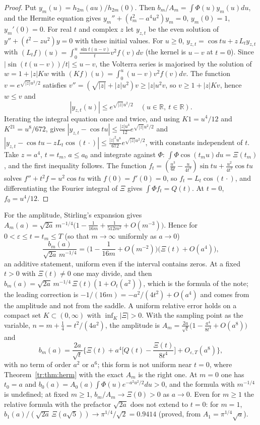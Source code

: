 \begin{proof}
Put $y_m(u)=h_{2m}(au)/h_{2m}(0)$. Then $b_m/A_m=\int\Phi(u)y_m(u)du$, and the Hermite equation gives $y_m''+(t_m^2-a^4u^2)y_m=0$, $y_m(0)=1$, $y_m'(0)=0$. For real $t$ and complex $z$ let $y_{z,t}$ be the even solution of $y''+(t^2-zu^2)y=0$ with these initial values. For $u\ge0$, $y_{z,t}=\cos tu+z\,L_ty_{z,t}$ with $(L_tf)(u)=\int_0^u\frac{\sin t(u-v)}tv^2f(v)dv$ (the kernel is $u-v$ at $t=0$). Since $|\sin(t(u-v))/t|\le u-v$, the Volterra series is majorised by the solution of $w=1+|z|Kw$ with $(Kf)(u)=\int_0^u(u-v)v^2f(v)dv$. The function $v=e^{\sqrt{|z|}u^2/2}$ satisfies $v''=(\sqrt{|z|}+|z|u^2)v\ge|z|u^2v$, so $v\ge1+|z|Kv$, hence $w\le v$ and
\[
|y_{z,t}(u)|\le e^{\sqrt{|z|}u^2/2}\quad(u\in\mathbb R,\ t\in\mathbb R).
\]
Iterating the integral equation once and twice, and using $K1=u^4/12$ and $K^21=u^8/672$, gives $|y_{z,t}-\cos tu|\le\frac{|z|u^4}{12}e^{\sqrt{|z|}u^2/2}$ and $|y_{z,t}-\cos tu-zL_t\cos(t\,\cdot)|\le\frac{|z|^2u^8}{672}e^{\sqrt{|z|}u^2/2}$, with constants independent of $t$. Take $z=a^4$, $t=t_m$, $a\le a_0$ and integrate against $\Phi$: $\int\Phi\cos(t_mu)du=\Xi(t_m)$, and the first inequality follows. The function $f_t=(\frac{u^3}{6t}-\frac u{4t^3})\sin tu+\frac{u^2}{4t^2}\cos tu$ solves $f''+t^2f=u^2\cos tu$ with $f(0)=f'(0)=0$, so $f_t=L_t\cos(t\,\cdot)$, and differentiating the Fourier integral of $\Xi$ gives $\int\Phi f_t=Q(t)$. At $t=0$, $f_0=u^4/12$.
\end{proof}

For the amplitude, Stirling's expansion gives $A_m(a)=\sqrt{2a}\,m^{-1/4}\big(1-\frac1{16m}+\frac1{512m^2}+O(m^{-3})\big)$. Hence for $0<\varepsilon\le t=t_m\le T$ (so that $m\to\infty$ uniformly as $a\to0$)
\begin{equation}\label{tr:eq:amp}
\frac{b_m(a)}{\sqrt{2a}\,m^{-1/4}}=\Big(1-\frac1{16m}+O(m^{-2})\Big)\big(\Xi(t)+O(a^4)\big),
\end{equation}
an additive statement, uniform even if the interval contains zeros. At a fixed $t>0$ with $\Xi(t)\ne0$ one may divide, and then $b_m(a)=\sqrt{2a}\,m^{-1/4}\,\Xi(t)(1+O_t(a^2))$, which is the formula of the note; the leading correction is $-1/(16m)=-a^2/(4t^2)+O(a^4)$ and comes from the amplitude and not from the saddle. A uniform relative error holds on a compact set $K\subset(0,\infty)$ with $\inf_K|\Xi|>0$. With the sampling point as the variable, $n=m+\frac14=t^2/(4a^2)$, the amplitude is $A_m=\frac{2a}{\sqrt t}\big(1-\frac{a^4}{8t^4}+O(a^8)\big)$ and
\[
b_m(a)=\frac{2a}{\sqrt t}\Big\{\Xi(t)+a^4\Big[Q(t)-\frac{\Xi(t)}{8t^4}\Big]+O_{\varepsilon,T}(a^8)\Big\},
\]
with no term of order $a^2$ or $a^6$; this form is not uniform near $t=0$, where Theorem~\ref{tr:thm:herm} with the exact $A_m$ is the right one. At $m=0$ one has $t_0=a$ and $b_0(a)=A_0(a)\int\Phi(u)e^{-a^2u^2/2}du>0$, and the formula with $m^{-1/4}$ is undefined; at fixed $m\ge1$, $b_m/A_m\to\Xi(0)>0$ as $a\to0$. Even for $m\ge1$ the relative formula with the prefactor $\sqrt{2a}$ does not extend to $t=0$: for $m=1$, $b_1(a)/(\sqrt{2a}\,\Xi(a\sqrt5))\to\pi^{1/4}/\sqrt2=0.9414$ (proved, from $A_1=\pi^{1/4}\sqrt a$).

